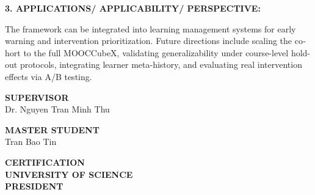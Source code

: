\begin{english}
\vspace{0.2cm}
\noindent\textbf{3. APPLICATIONS/ APPLICABILITY/ PERSPECTIVE:}

\noindent The framework can be integrated into learning management systems for early warning and intervention prioritization. Future directions include scaling the cohort to the full MOOCCubeX, validating generalizability under course-level hold-out protocols, integrating learner meta-history, and evaluating real intervention effects via A/B testing.

\vspace{0.5cm}
\noindent
\begin{minipage}[t]{0.48\textwidth}
\centering
\textbf{SUPERVISOR}\\[1.3cm]
Dr. Nguyen Tran Minh Thu
\end{minipage}\hfill
\begin{minipage}[t]{0.48\textwidth}
\centering
\textbf{MASTER STUDENT}\\[1.3cm]
Tran Bao Tin
\end{minipage}

\vspace{0.8cm}
\begin{center}
\textbf{CERTIFICATION}\\
\textbf{UNIVERSITY OF SCIENCE}\\[1.1cm]
\textbf{PRESIDENT}
\end{center}
\end{english}

\clearpage
